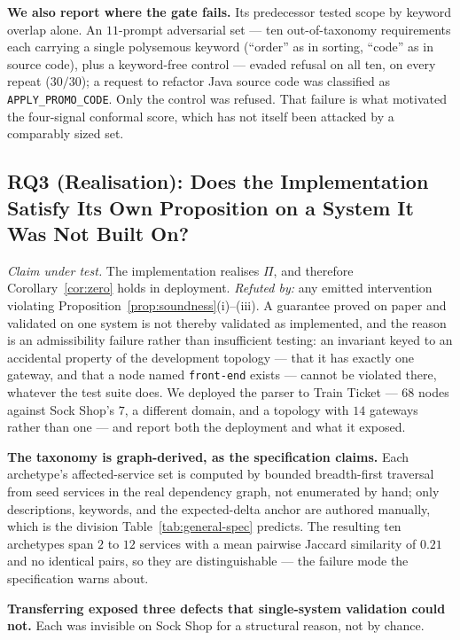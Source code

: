 \documentclass[journal, 10pt]{IEEEtran}
\begin{document}
\textbf{We also report where the gate fails.} Its predecessor tested scope by
keyword overlap alone. An $11$-prompt adversarial set --- ten out-of-taxonomy
requirements each carrying a single polysemous keyword (``order'' as in sorting,
``code'' as in source code), plus a keyword-free control --- evaded refusal on
all ten, on every repeat ($30/30$); a request to refactor Java source code was
classified as \texttt{APPLY\_PROMO\_CODE}. Only the control was refused. That
failure is what motivated the four-signal conformal score, which has not itself
been attacked by a comparably sized set.

\subsection{RQ3 (Realisation): Does the Implementation Satisfy Its Own Proposition on a System It Was Not Built On?}
\label{sec:rq3}

\emph{Claim under test.} The implementation realises $\Pi$, and therefore
Corollary~\ref{cor:zero} holds in deployment. \emph{Refuted by:} any emitted
intervention violating Proposition~\ref{prop:soundness}(i)--(iii). A guarantee
proved on paper and validated on one system is not thereby validated as
implemented, and the reason is an admissibility failure rather than insufficient
testing: an invariant keyed to an accidental property of the development topology
--- that it has exactly one gateway, and that a node named \texttt{front-end}
exists --- cannot be violated there, whatever the test suite does.
We deployed the parser to Train Ticket --- $68$ nodes against
Sock Shop's $7$, a different domain, and a topology with $14$ gateways rather
than one --- and report both the deployment and what it exposed.

\textbf{The taxonomy is graph-derived, as the specification claims.} Each
archetype's affected-service set is computed by bounded breadth-first traversal
from seed services in the real dependency graph, not enumerated by hand; only
descriptions, keywords, and the expected-delta anchor are authored manually, which
is the division Table~\ref{tab:general-spec} predicts. The resulting ten
archetypes span $2$ to $12$ services with a mean pairwise Jaccard similarity of
$0.21$ and no identical pairs, so they are distinguishable --- the failure mode
the specification warns about.

\textbf{Transferring exposed three defects that single-system validation could
not.} Each was invisible on Sock Shop for a structural reason, not by chance.
\end{document}
